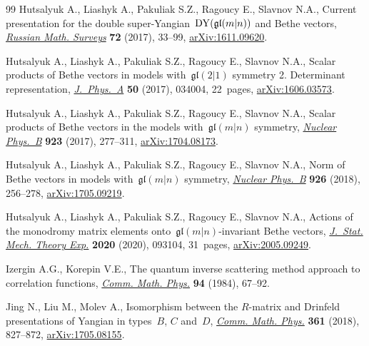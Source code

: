 \documentclass[10pt,a4paper]{amsart}
\theoremstyle{definition}
\begin{document}
\begin{thebibliography}{99}
Hutsalyuk A., Liashyk A., Pakuliak S.Z., Ragoucy E., Slavnov N.A., Current
 presentation for the double super-Yangian~${\rm DY}(\mathfrak{gl}(m|n))$ and Bethe
 vectors, \href{https://doi.org/10.1070/RM9754}{\textit{Russian Math.
 Surveys}} \textbf{72} (2017), 33--99,
 \href{http://arxiv.org/abs/1611.09620}{arXiv:1611.09620}.

Hutsalyuk A., Liashyk A., Pakuliak S.Z., Ragoucy E., Slavnov N.A., Scalar
 products of {B}ethe vectors in models with~{$\mathfrak{gl}(2|1)$} symmetry 2.
 {D}eterminant representation,
 \href{https://doi.org/10.1088/1751-8121/50/3/034004}{\textit{J.~Phys.~A}}
 \textbf{50} (2017), 034004, 22~pages,
 \href{http://arxiv.org/abs/1606.03573}{arXiv:1606.03573}.

Hutsalyuk A., Liashyk A., Pakuliak S.Z., Ragoucy E., Slavnov N.A., Scalar
 products of {B}ethe vectors in the models with~$\mathfrak{gl}(m|n)$ symmetry,
 \href{https://doi.org/10.1016/j.nuclphysb.2017.07.020}{\textit{Nuclear
 Phys.~B}} \textbf{923} (2017), 277--311,
 \href{http://arxiv.org/abs/1704.08173}{arXiv:1704.08173}.

Hutsalyuk A., Liashyk A., Pakuliak S.Z., Ragoucy E., Slavnov N.A., Norm of
 {B}ethe vectors in models with~{$\mathfrak{gl}(m|n)$} symmetry,
 \href{https://doi.org/10.1016/j.nuclphysb.2017.11.006}{\textit{Nuclear
 Phys.~B}} \textbf{926} (2018), 256--278,
 \href{http://arxiv.org/abs/1705.09219}{arXiv:1705.09219}.

Hutsalyuk A., Liashyk A., Pakuliak S.Z., Ragoucy E., Slavnov N.A., Actions of
 the monodromy matrix elements onto~{$\mathfrak{gl}(m|n)$}-invariant {B}ethe
 vectors, \href{https://doi.org/10.1088/1742-5468/abacb2}{\textit{J.~Stat.
 Mech. Theory Exp.}} \textbf{2020} (2020), 093104, 31~pages,
 \href{http://arxiv.org/abs/2005.09249}{arXiv:2005.09249}.

Izergin A.G., Korepin V.E., The quantum inverse scattering method approach to
 correlation functions,
 \href{https://doi.org/10.1007/BF01212350}{\textit{Comm. Math. Phys.}}
 \textbf{94} (1984), 67--92.

Jing N., Liu M., Molev A., Isomorphism between the {$R$}-matrix and {D}rinfeld
 presentations of {Y}angian in types~{$B$}, {$C$} and~{$D$},
 \href{https://doi.org/10.1007/s00220-018-3185-x}{\textit{Comm. Math. Phys.}}
 \textbf{361} (2018), 827--872,
 \href{http://arxiv.org/abs/1705.08155}{arXiv:1705.08155}.


\end{thebibliography}
\end{document}
